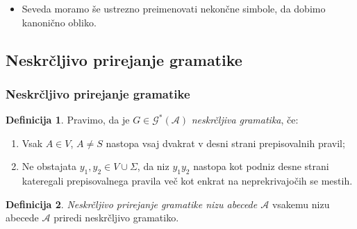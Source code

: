 \documentclass{beamer}
\theoremstyle{definition}
\newtheorem{definicija}{Definicija}[section]
\newcommand{\A}{\mathcal{A}}
\newcommand{\G}{\mathcal{G}}
\begin{document}
\begin{frame}
{\begin{itemize}
\begin{align*}
                A_{0001} &\rightarrow A_{00}A_{01}, \\
                A_{01} &\rightarrow A_{0}A_{1}, \\
                A_{00} &\rightarrow A_{0}A_{0}, \\
                A_{1} &\rightarrow 1, \\
                A_{0} &\rightarrow 0.
            \end{align*}
            \item Seveda moramo še ustrezno preimenovati nekončne simbole, da dobimo kanonično
            obliko.
        \end{itemize}
    }
\end{frame}

\subsection{Neskrčljivo prirejanje gramatike}

\begin{frame}
    \frametitle{Neskrčljivo prirejanje gramatike}
    \begin{definicija}
        Pravimo, da je $G \in \G^*(\A)$ \emph{neskrčljiva gramatika}, če:
        \begin{enumerate}
            \item Vsak $A \in V$, $A \neq S$ nastopa vsaj dvakrat v desni strani prepisovalnih pravil;
            \item Ne obstajata $y_1,y_2 \in V \cup \Sigma$, da niz $y_1y_2$ nastopa kot podniz desne 
            strani kateregali prepisovalnega pravila več kot enkrat na neprekrivajočih se mestih. 
        \end{enumerate}
    \end{definicija}
    \pause
    \begin{definicija}
        \emph{Neskrčljivo prirejanje gramatike nizu abecede $\A$} vsakemu nizu abecede $\A$ priredi
        neskrčljivo gramatiko.
    \end{definicija}
\end{frame}
\end{document}
